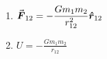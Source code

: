 

\vspace*{\fill}
\centering

\begin{enumerate}
    \item $\displaystyle \va*{F}_{12} = -\frac{G m_1 m_2}{r_{12}^2} \vu*{r}_{12}$
    \item $\displaystyle U = -\frac{G m_1 m_2}{r_{12}}$
\end{enumerate}

\centering
\vspace*{\fill}

